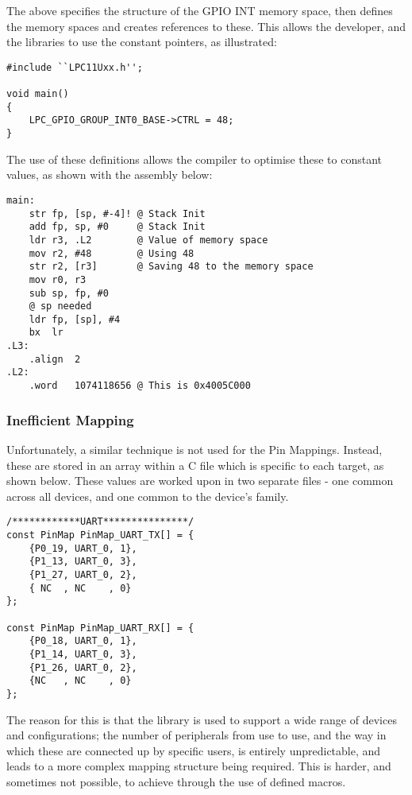 The above specifies the structure of the GPIO INT memory space, then defines the memory spaces and creates references to these. This allows the developer, and the libraries to use the constant pointers, as illustrated:

\begin{lstlisting}[caption={LPC GPIO GROUP INT0 being used}]
#include ``LPC11Uxx.h'';

void main()
{
    LPC_GPIO_GROUP_INT0_BASE->CTRL = 48;
}
\end{lstlisting}

The use of these definitions allows the compiler to optimise these to constant values, as shown with the assembly below:

\begin{lstlisting}[caption={LPC GPIO GROUP INT0 converted to ASM}]
main:
    str fp, [sp, #-4]! @ Stack Init
    add fp, sp, #0     @ Stack Init
    ldr r3, .L2        @ Value of memory space
    mov r2, #48        @ Using 48
    str r2, [r3]       @ Saving 48 to the memory space
    mov r0, r3
    sub sp, fp, #0
    @ sp needed
    ldr fp, [sp], #4
    bx  lr
.L3:
    .align  2
.L2:
    .word   1074118656 @ This is 0x4005C000
\end{lstlisting}

\subsubsection{Inefficient Mapping}

Unfortunately, a similar technique is not used for the Pin Mappings. Instead, these are stored in an array within a C file which is specific to each target, as shown below. These values are worked upon in two separate files - one common across all devices, and one common to the device's family.

\begin{lstlisting}[caption={PinMap Arrays}]
/************UART***************/
const PinMap PinMap_UART_TX[] = {
    {P0_19, UART_0, 1},
    {P1_13, UART_0, 3},
    {P1_27, UART_0, 2},
    { NC  , NC    , 0}
};

const PinMap PinMap_UART_RX[] = {
    {P0_18, UART_0, 1},
    {P1_14, UART_0, 3},
    {P1_26, UART_0, 2},
    {NC   , NC    , 0}
};
\end{lstlisting}

The reason for this is that the library is used to support a wide range of devices and configurations; the number of peripherals from use to use, and the way in which these are connected up by specific users, is entirely unpredictable, and leads to a more complex mapping structure being required. This is harder, and sometimes not possible, to achieve through the use of defined macros.

